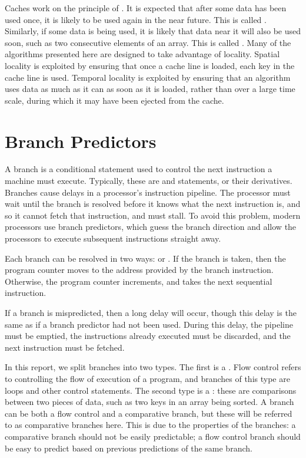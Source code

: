 Caches work on the principle of . It is expected that after some
data has been used once, it is likely to be used again in the near future. This
is called . Similarly, if some data is being used, it is
likely that data near it will also be used soon, such as two consecutive
elements of an array. This is called . Many of the
algorithms presented here are designed to take advantage of locality. Spatial
locality is exploited by ensuring that once a cache line is loaded, each key in
the cache line is used. Temporal locality is exploited by ensuring that an
algorithm uses data as much as it can as soon as it is loaded, rather than over
a large time scale, during which it may have been ejected from the cache.

\section{Branch Predictors}

A branch is a conditional statement used to control the next instruction a
machine must execute. Typically, these are  and  statements,
or their derivatives. Branches cause delays in a processor's instruction
pipeline.  The processor must wait until the branch is resolved before it knows
what the next instruction is, and so it cannot fetch that instruction, and must
stall. To avoid this problem, modern processors use branch predictors, which
guess the branch direction and allow the processors to execute subsequent
instructions straight away.

Each branch can be resolved in two ways:  or . If the branch is
taken, then the program counter moves to the address provided by the branch
instruction. Otherwise, the program counter increments, and takes the next
sequential instruction.

If a branch is mispredicted, then a long delay will occur, though this delay is
the same as if a branch predictor had not been used. During this delay, the
pipeline must be emptied, the instructions already executed must be discarded,
and the next instruction must be fetched.

In this report, we split branches into two types. The first is a . Flow control refers to controlling the flow of execution of a
program, and branches of this type are loops and other control statements.
The second type is a : these are comparisons between two
pieces of data, such as two keys in an array being sorted. A branch can be both
a flow control and a comparative branch, but these will be referred to as
comparative branches here. This is due to the properties of the branches: a
comparative branch should not be easily predictable; a flow control branch
should be easy to predict based on previous predictions of the same branch.

